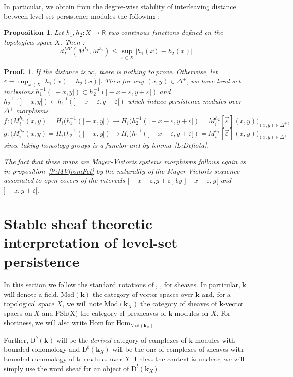 \documentclass[a4paper, english, 11pt]{article}
\newcommand{\kk}[0]{\textbf{k}}
\newcommand{\Mod}[0]{\text{Mod}}
\newcommand{\0}{\vec{0}}
\newcommand{\R}[0]{\mathbb{R}}
\newcommand{\D}[0]{\text{D}}
\newcommand{\Hom}[0]{\text{Hom}}
\newtheorem{prop}{Proposition}[section]
\newtheorem*{pf}{Proof.} }
\begin{document}
In particular, we obtain from the degree-wise stability of interleaving distance between level-set persistence modules the following : 

\begin{prop}\label{P:StabilityfordMV}
Let $h_1,h_2 : X \to \R$ two continous functions defined on the topological space $X$. Then : $$d_I^{MV}(M^{h_1},M^{h_2})\leq \sup_{x\in X} |h_1(x)-h_2(x)| $$

\end{prop}
\begin{pf} If the distance is $\infty$, there is nothing to prove. Otherwise, let $\varepsilon= \sup_{x\in X} |h_1(x)-h_2(x)|$. Then for any $(x,y)\in \Delta^{+}$, we have  level-set inclusions  $h^{-1}_1(]-x,y[) \subset h^{-1}_2(]-x-\varepsilon, y+\varepsilon[)$ and  $h^{-1}_2(]-x,y[) \subset h^{-1}_1(]-x-\varepsilon, y+\varepsilon[)$ which induce persistence modules over $\Delta^+$ morphisms 
$$f:\big(M_i^{h_1}(x,y)=H_i(h_1^{-1}(]-x,y[) \to H_i(h_2^{-1}(]-x-\varepsilon,y+\varepsilon[)= M_i^{h_2}[\vec{\varepsilon}](x,y)\big)_{(x,y)\in \Delta^+},  $$ 
$$g:\big(M_i^{h_2}(x,y)=H_i(h_2^{-1}(]-x,y[) \to H_i(h_1^{-1}(]-x-\varepsilon,y+\varepsilon[)= M_i^{h_1}[\vec{\varepsilon}](x,y)\big)_{(x,y)\in \Delta^+} $$ since 
taking homology groups is a functor and by lemma~\ref{L:Defiota}. 

The fact that these maps are Mayer-Vietoris systems morphisms follows again as in proposition~\ref{P:MVfromFct} by the naturality of the Mayer-Vietoris sequence associated to open covers of the intervals $]-x-\varepsilon, y+\varepsilon[$ by $]-x-\varepsilon, y[$ and $]-x, y+\varepsilon[$.
\end{pf}


\section{Stable sheaf theoretic interpretation of level-set persistence}
In this section we follow the standard notations of \cite{Kash90}, \cite{KS18}, \cite{Berk18} for sheaves. 
In particular,  $\kk$ will denote a field, $\Mod(\kk)$ the category of vector spaces over $\kk$ and, for   a topological space $X$,  we will note $\Mod(\kk_X)$ the category of sheaves of $\kk$-vector spaces on $X$ and $\text{PSh(X)}$ the category of presheaves of $\kk$-modules on $X$. For shortness, we will also write $\Hom$ for $\Hom_{\Mod(\kk_\R)}$.

Further, $\D^b(\kk)$ will be the \emph{derived} category of complexes of $\kk$-modules with bounded cohomology and $\D^b(\kk_X)$ will be the one of complexes of sheaves with bounded cohomology of $\kk$-modules over $X$. 
 Unless the context is unclear, we will simply use the word  sheaf for an object of $\D^b(\kk_X)$. 
 
\end{document}
